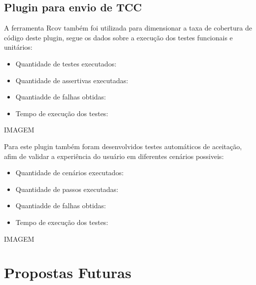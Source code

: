 \subsection{Plugin para envio de TCC}

A ferramenta Rcov também foi utilizada para dimensionar a taxa de cobertura de código deste plugin, segue os dados sobre a execução dos testes funcionais e unitários:
\begin{itemize}
\item Quantidade de testes executados: 
\item Quantidade de assertivas executadas: 
\item Quantiadde de falhas obtidas: 
\item Tempo de execução dos testes: 
\end{itemize}

IMAGEM

Para este plugin também foram desenvolvidos testes automáticos de aceitação, afim de validar a experiência do usuário em diferentes cenários possiveis:
\begin{itemize}
\item Quantidade de cenários executados: 
\item Quantidade de passos executadas: 
\item Quantiadde de falhas obtidas: 
\item Tempo de execução dos testes: 
\end{itemize}

IMAGEM

\section{Propostas Futuras}

